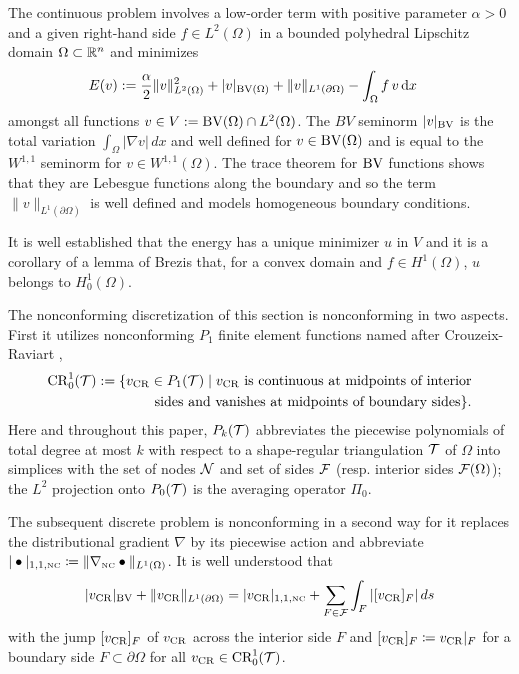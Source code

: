 The continuous problem involves a low-order term  with positive  parameter
$\alpha > 0$  and a given right-hand side  $f\in L^2(\Omega)$ in a bounded
polyhedral  Lipschitz domain 
$\Omega\subset \mathbb{R}^n$ and minimizes
\begin{align}\label{e:defEintro} 
  E(v)& :=    
  \frac{\alpha}{2} \|  v
  \|_{L^2(\Omega)}^2 + \lvert v\rvert_{\operatorname{BV}(\Omega)}
  + \| v \|_{L^1(\partial\Omega)}  -\int_\Omega f\, v\,\mathrm dx 
\end{align} amongst all
functions $v\in V:=\operatorname{BV}(\Omega)\cap L^2(\Omega)$.  The  $BV$ seminorm $\lvert
v\rvert_{\operatorname{BV}}$ is  the total variation $\int_\Omega |\nabla v|\, dx $ and
well defined for $v\in \operatorname{BV}(\Omega)$ and is equal to the $W^{1,1}$ seminorm
for $v\in W^{1,1}(\Omega)$. The trace theorem for $\operatorname{BV}$ functions shows that
they are Lebesgue functions along the boundary and so the  term $ \|  v
\|_{L^1(\partial\Omega)}$ is well defined and models homogeneous boundary
conditions. 

It is well established that the energy has a unique minimizer $u$ in $V$ and it
is a corollary of a lemma of Brezis that, for a convex domain and $f\in
H^1(\Omega)$,  $u$ belongs to $ H^1_0(\Omega)$.

The nonconforming discretization of this section is nonconforming in two
aspects. First it utilizes nonconforming $P_1$ finite element functions named
after Crouzeix-Raviart \cite{CrouzeixRaviart1973}, 
\begin{align*}
  {\operatorname{CR}}^1_0(\mathcal{T}):=\{v_{\operatorname{CR}}\in P_1(\mathcal{T})\;\vert\;v_{\operatorname{CR}} \text{ is continuous at midpoints of
  interior}\\ \text{sides and vanishes at midpoints of boundary sides}\}.
\end{align*} 
Here and throughout this paper,  $P_k(\mathcal{T})$ abbreviates the
piecewise polynomials of total degree at most $k$ with respect to a
shape-regular triangulation $\mathcal{T}$ of $\Omega$ into simplices with the set of
nodes $\mathcal{N}$ and set of sides $\mathcal{F}$ (resp. interior sides $\mathcal{F}(\Omega)$);  the
$L^2$ projection onto $P_0(\mathcal{T})$  is the averaging operator $\Pi_0$.
 

The subsequent discrete problem is nonconforming in a second way for
it replaces the distributional 
gradient $\nabla$ by its piecewise action 
and abbreviate
$|\bullet |_{1,1,{\textup{\tiny NC}}}\coloneqq
\|  \nabla_{\textup{\tiny NC}}\bullet\|_{L^1(\Omega)}$. 
It is well understood that 
\[
\lvert v_{\operatorname{CR}} \rvert_{\operatorname{BV}}+  \|  v_{\operatorname{CR}} \|_{L^1(\partial\Omega)} 
=   | v_{\operatorname{CR}}  |_{1,1,{\textup{\tiny NC}}} + \sum_{F\in\mathcal{F}} \int_F  | [v_{\operatorname{CR}}]_F|\, ds 
\]
with the jump  $[v_{\operatorname{CR}}]_F$ of $v_{\operatorname{CR}}$ across the interior side $F$ 
and $[v_{\operatorname{CR}}]_F \coloneqq v_{\operatorname{CR}}|_F$ for a boundary side $F\subset\partial\Omega$
for all $v_{\operatorname{CR}}\in \textup{CR}_0^1(\mathcal{T})$. 


